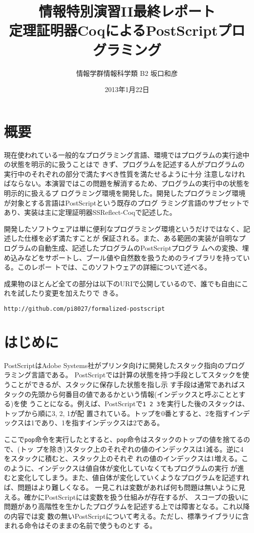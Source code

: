 \documentclass[a4paper, 10pt, twocolumn, titlepage]{ujarticle}
\title{情報特別演習II最終レポート\\定理証明器CoqによるPostScriptプログラミング}
\author{情報学群情報科学類 B2 坂口和彦}
\date{2013年1月22日}
\renewcommand{\{}{\symbol{"7B}}
\renewcommand{\}}{\symbol{"7D}}
\begin{document}
\clearpage

\maketitle

\section{概要}

現在使われている一般的なプログラミング言語、環境ではプログラムの実行途中の状態を明示的に扱うことはで
きず、プログラムを記述する人がプログラムの実行中のそれぞれの部分で満たすべき性質を満たせるように十分
注意しなければならない。本演習ではこの問題を解消するため、プログラムの実行中の状態を明示的に扱えるプ
ログラミング環境を開発した。開発したプログラミング環境が対象とする言語はPostScriptという既存のプログ
ラミング言語のサブセットであり、実装は主に定理証明器SSReflect-Coqで記述した。

開発したソフトウェアは単に便利なプログラミング環境というだけではなく、記述した仕様を必ず満たすことが
保証される。また、ある範囲の実装が自明なプログラムの自動生成、記述したプログラムのPostScriptプログラ
ムへの変換、埋め込みなどをサポートし、ブール値や自然数を扱うためのライブラリを持っている。このレポー
トでは、このソフトウェアの詳細について述べる。

成果物のほとんど全ての部分は以下のURIで公開しているので、誰でも自由にこれを試したり変更を加えたりで
きる。

{\small\texttt{http://github.com/pi8027/formalized-postscript}}

\section{はじめに}

PostScriptはAdobe Systems社がプリンタ向けに開発したスタック指向のプログラミング言語である。
PostScriptでは計算の状態を持つ手段としてスタックを使うことができるが、スタックに保存した状態を指し示
す手段は通常であればスタックの先頭から何番目の値であるかという情報(インデックスと呼ぶこととする)を使
うことになる。例えば、PostScriptで\texttt{1 2 3}を実行した後のスタックは、トップから順に3, 2, 1が配
置されている。トップを0番とすると、2を指すインデックスは1であり、1を指すインデックスは2である。

ここで\texttt{pop}命令を実行したとすると、\texttt{pop}命令はスタックのトップの値を捨てるので、(トッ
プを除き)スタック上のそれぞれの値のインデックスは1減る。逆に4をスタックに積むと、スタック上のそれぞ
れの値のインデックスは1増える。このように、インデックスは値自体が変化していなくてもプログラムの実行
が進むと変化してしまう。また、値自体が変化していくようなプログラムを記述すれば、問題はより難しくなる。
一見これは変数があれば何も問題は無いように見える。確かにPostScriptには変数を扱う仕組みが存在するが、
スコープの扱いに問題があり高階性を生かしたプログラムを記述する上では障害となる。これ以降の内容では変
数の無いPostScriptについて考える。ただし、標準ライブラリに含まれる命令はそのままの名前で使うものとす
る。
\end{document}
